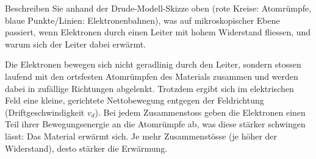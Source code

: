 \needspace{6cm}
\begin{questions}
\setcounter{question}{1}
\begin{taskbox}
\question[3] Beschreiben Sie anhand der Drude-Modell-Skizze oben (rote
Kreise: Atomrümpfe, blaue Punkte/Linien: Elektronenbahnen), was auf
mikroskopischer Ebene passiert, wenn Elektronen durch einen Leiter mit
hohem Widerstand fliessen, und warum sich der Leiter dabei erwärmt.
\begin{answerbox}
\vspace{2.6cm}
\end{answerbox}
\begin{solution}
Die Elektronen bewegen sich nicht geradlinig durch den Leiter, sondern
stossen laufend mit den ortsfesten Atomrümpfen des Materials zusammen und
werden dabei in zufällige Richtungen abgelenkt. Trotzdem ergibt sich im
elektrischen Feld eine kleine, gerichtete Nettobewegung entgegen der
Feldrichtung (Driftgeschwindigkeit $v_d$). Bei jedem Zusammenstoss geben
die Elektronen einen Teil ihrer Bewegungsenergie an die Atomrümpfe ab, was
diese stärker schwingen lässt: Das Material erwärmt sich. Je mehr
Zusammenstösse (je höher der Widerstand), desto stärker die Erwärmung.
\end{solution}
\end{taskbox}
\end{questions}

